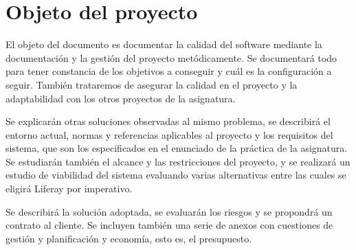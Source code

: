 \chapter{Objeto del proyecto}

\par El objeto del documento es documentar la calidad del software mediante la documentación y la gestión del proyecto metódicamente. Se documentará todo para tener constancia de los objetivos a conseguir y cuál es la configuración a seguir. También trataremos de asegurar la calidad en el proyecto y la adaptabilidad con los otros proyectos de la asignatura.

\par Se explicarán otras soluciones observadas al mismo problema, se describirá el entorno actual, normas y referencias aplicables al proyecto y los requisitos del sistema, que son los especificados en el enunciado de la práctica de la asignatura. Se estudiarán también el alcance y las restricciones del proyecto, y se realizará un estudio de viabilidad del sistema evaluando varias alternativas entre las cuales se eligirá Liferay por imperativo.

\par Se describirá la solución adoptada, se evaluarán los riesgos y se propondrá un contrato al cliente. Se incluyen también una serie de anexos con cuestiones de gestión y planificación y economía, esto es, el presupuesto.
